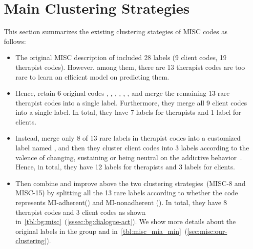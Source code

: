 \section{Main Clustering Strategies}
\label{sec:misc:other-clustering}
This section summarizes the existing clustering stategies of MISC
codes as follows:
\begin{itemize}
\item {} The original MISC description of
  \citet{miller2003manual} included 28 labels (9 client codes, 19
  therapist codes). However, among them, there are 13 therapist codes
  are too rare to learn an efficient model on predicting them.

\item {} Hence, \citet{can2015dialog} retain 6 original
  codes \FA, \GI, \QUC, \QUO, \REC, \RES, and merge the remaining 13
  rare therapist codes into a single  label.  Furthermore,
  they merge all 9 client codes into a single  label. In
  total, they have 7 labels for therapists and 1 label for clients.

\item {} Instead, \citet{tanana2016comparison} merge only 8
  of 13 rare labels in therapist codes into a customized label named
  , and then they cluster client codes into 3 labels
  according to the valence of changing, sustaining or being neutral on
  the addictive behavior~\citep{atkins2014scaling}. Hence, in total,
  they have 12 labels for therapists and 3 labels for clients.

\item {} Then \citet{xiao2016behavioral} combine and
  improve above the two clustering strategies~(MISC-8 and MISC-15) by
  splitting all the 13 rare labels according to whether the code
  represents MI-adherent(\MIA) and MI-nonadherent (\MIN). In total,
  they have 8 therapist codes and 3 client codes as shown
  in~\autoref{tbl:bg:misc}~(\autoref{sssec:bg:dialogue-act}). We show
  more details about the original labels in the group \MIA and \MIN
  in~\autoref{tbl:misc_mia_min}~(\autoref{sec:misc:our-clustering}).
\end{itemize}

